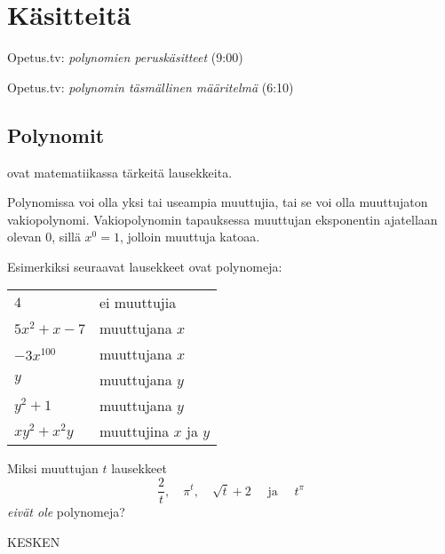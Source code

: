 \section{Käsitteitä}

{Opetus.tv: \emph{polynomien peruskäsitteet} (9:00)}

{Opetus.tv: \emph{polynomin täsmällinen määritelmä} (6:10)}

\subsection*{Polynomit}

 ovat matematiikassa tärkeitä lausekkeita.


Polynomissa voi olla yksi tai useampia muuttujia, tai se voi olla muuttujaton vakiopolynomi. Vakiopolynomin tapauksessa muuttujan eksponentin ajatellaan olevan $0$, sillä $x^0=1$, jolloin muuttuja katoaa.

\begin{esimerkki}
Esimerkiksi seuraavat lausekkeet ovat polynomeja:

\begin{tabular}{ll}
$4$ &  ei muuttujia\\
 $5x^2+x-7$ &   muuttujana $x$\\
 $-3x^{100}$& muuttujana $x$\\
 $y$& muuttujana $y$\\
 $y^2+1$& muuttujana $y$\\
 $xy^2+x^2y$& muuttujina $x$ ja $y$
\end{tabular}

\end{esimerkki}

\begin{esimerkki}

Miksi muuttujan $t$ lausekkeet 
\[ \frac{2}{t}, \quad \pi^t,  \quad \sqrt{t}+2 \quad \text{ ja } \quad t^\pi \]  \emph{eivät ole} polynomeja?


	\begin{esimratk}

KESKEN


	\end{esimratk}


\end{esimerkki}

